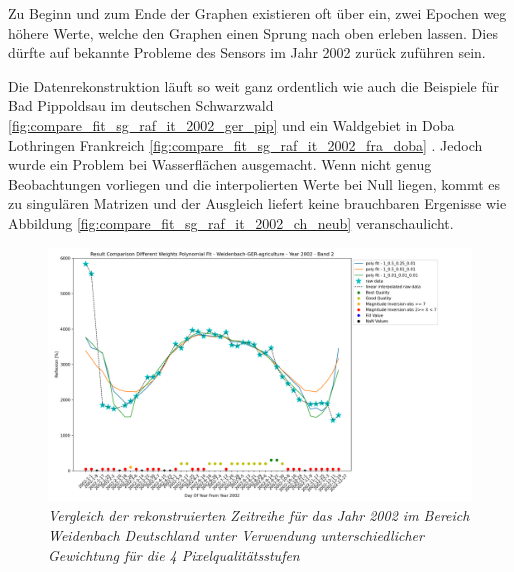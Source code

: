 \documentclass[11pt]{report}
\begin{document}
Zu Beginn und zum Ende der Graphen existieren oft über ein, zwei Epochen weg höhere Werte, welche den Graphen einen Sprung nach oben erleben lassen. Dies dürfte auf bekannte Probleme des Sensors im Jahr 2002 zurück zuführen sein. 

Die Datenrekonstruktion läuft so weit ganz ordentlich wie auch die Beispiele für Bad Pippoldsau im deutschen Schwarzwald \ref{fig:compare_fit_sg_raf_it_2002_ger_pip} und ein Waldgebiet in Doba Lothringen Frankreich \ref{fig:compare_fit_sg_raf_it_2002_fra_doba} . Jedoch wurde ein Problem bei Wasserflächen ausgemacht. Wenn nicht genug Beobachtungen vorliegen und die interpolierten Werte bei Null liegen, kommt es zu singulären Matrizen und der Ausgleich liefert keine brauchbaren Ergenisse wie  Abbildung \ref{fig:compare_fit_sg_raf_it_2002_ch_neub} veranschaulicht. 
\begin{figure}[H]
\hspace*{-2.5cm}
\includegraphics[scale=0.55]{./Grafiken/Fitting/Fitting_method_comparison/selected_comparisons_poly/Fit_comparison_poly_all_Weidenbach-GER-agriculture_2002.png}
\caption{\textit{Vergleich der rekonstruierten Zeitreihe für das Jahr 2002 im Bereich Weidenbach Deutschland unter Verwendung unterschiedlicher Gewichtung für die 4 Pixelqualitätsstufen}}
\label{fig:compare_fit_sg_raf_it_2002_ger}
\end{figure}
\end{document}
